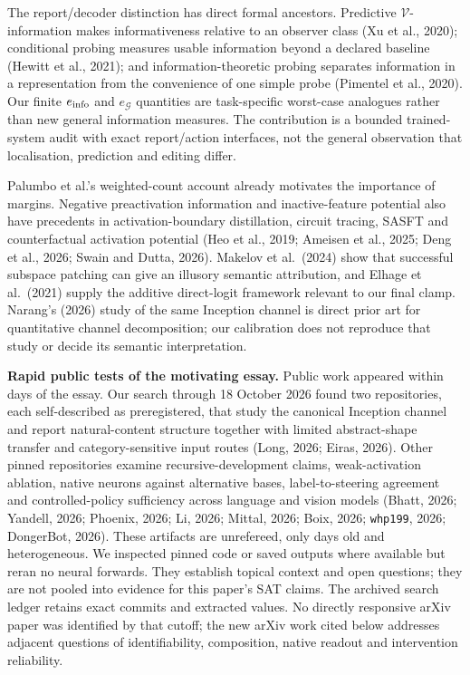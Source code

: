 \documentclass[
  british,
  11pt,
  a4paper,
]{article}
\begin{document}
The report/decoder distinction has direct formal ancestors. Predictive
\(\mathcal V\)-information makes informativeness relative to an observer
class (Xu et al., 2020); conditional probing measures usable information
beyond a declared baseline (Hewitt et al., 2021); and
information-theoretic probing separates information in a representation
from the convenience of one simple probe (Pimentel et al., 2020). Our
finite \(e_{\rm info}\) and \(e_{\mathcal G}\) quantities are
task-specific worst-case analogues rather than new general information
measures. The contribution is a bounded trained-system audit with exact
report/action interfaces, not the general observation that localisation,
prediction and editing differ.

Palumbo et al.'s weighted-count account already motivates the importance
of margins. Negative preactivation information and inactive-feature
potential also have precedents in activation-boundary distillation,
circuit tracing, SASFT and counterfactual activation potential (Heo et
al., 2019; Ameisen et al., 2025; Deng et al., 2026; Swain and Dutta,
2026). Makelov et al.~(2024) show that successful subspace patching can
give an illusory semantic attribution, and Elhage et al.~(2021) supply
the additive direct-logit framework relevant to our final clamp.
Narang's (2026) study of the same Inception channel is direct prior art
for quantitative channel decomposition; our calibration does not
reproduce that study or decide its semantic interpretation.

\textbf{Rapid public tests of the motivating essay.} Public work
appeared within days of the essay. Our search through 18 October 2026
found two repositories, each self-described as preregistered, that study
the canonical Inception channel and report natural-content structure
together with limited abstract-shape transfer and category-sensitive
input routes (Long, 2026; Eiras, 2026). Other pinned repositories
examine recursive-development claims, weak-activation ablation, native
neurons against alternative bases, label-to-steering agreement and
controlled-policy sufficiency across language and vision models (Bhatt,
2026; Yandell, 2026; Phoenix, 2026; Li, 2026; Mittal, 2026; Boix, 2026;
\texttt{whp199}, 2026; DongerBot, 2026). These artifacts are unrefereed,
only days old and heterogeneous. We inspected pinned code or saved
outputs where available but reran no neural forwards. They establish
topical context and open questions; they are not pooled into evidence
for this paper's SAT claims. The archived search ledger retains exact
commits and extracted values. No directly responsive arXiv paper was
identified by that cutoff; the new arXiv work cited below addresses
adjacent questions of identifiability, composition, native readout and
intervention reliability.
\end{document}
